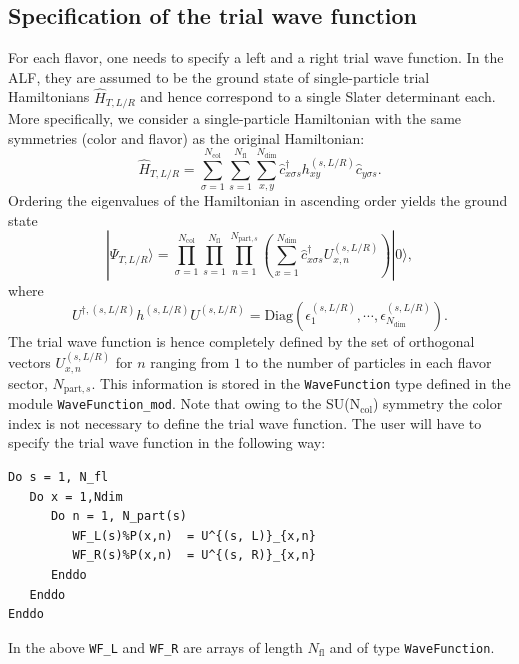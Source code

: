 \subsection{Specification of the trial wave function} \label{sec:trial_wave_function}

For each flavor, one needs to specify a left and a right trial wave function. In the ALF, they are assumed to be the ground state of single-particle trial Hamiltonians $\hat{H}_{T, L/R}$ and hence correspond to a single Slater determinant each. More specifically, we consider a single-particle Hamiltonian with the same symmetries (color and flavor) as the original Hamiltonian:
\begin{equation} \label{eq:trial_wave_function}
\hat{H}_{T,L/R} = 
\sum\limits_{\sigma=1}^{N_{\mathrm{col}}}
\sum\limits_{s=1}^{N_{\mathrm{fl}}}
\sum\limits_{x,y}^{N_{\mathrm{dim}}}
\hat{c}^{\dagger}_{x \sigma   s} h_{xy}^{(s, L/R)} \hat{c}^{\phantom\dagger}_{y \sigma s}.
\end{equation}
Ordering the eigenvalues  of the Hamiltonian in ascending order yields the ground state
\begin{equation}
	 | \Psi_{T,L/R} \rangle    =     \prod_{\sigma=1}^{N_{\mathrm{col}}}  \prod_{s=1}^{N_{\mathrm{fl}}}      \prod_{n=1}^{N_{\mathrm{part},s}} 
	 \left( \sum_{x=1}^{N_{\mathrm{dim}}}    \hat{c}^{\dagger}_{x \sigma   s} U^{(s, L/R)}_{x,n} \right) 
	  | 0 \rangle ,
\end{equation} 
where 
\begin{equation}
	U^{\dagger,(s, L/R)}h^{(s, L/R)}  U^{(s, L/R)}   = \mathrm{Diag} \left(   \epsilon_1^{(s, L/R)}, \cdots, \epsilon_{N_{\mathrm{dim}}}^{(s, L/R)} \right).
\end{equation}
The trial wave function is hence  completely defined by the set of orthogonal vectors  $ U^{(s, L/R)}_{x,n}  $    for  $ n $ ranging from  $ 1 $ to  the number of particles   in each flavor sector,  $N_{\mathrm{part},s}$.    This information  is stored in the \texttt{WaveFunction}   type defined in the module \texttt{WaveFunction\_mod}.    Note  that  owing to the SU(N$_{\mathrm{col}}$) symmetry the color index is not necessary to define  the trial wave function.  The user will have to specify the trial wave function in the following way:
\begin{lstlisting}[style=fortran]
Do s = 1, N_fl
   Do x = 1,Ndim
      Do n = 1, N_part(s)
         WF_L(s)%P(x,n)  = U^{(s, L)}_{x,n}
         WF_R(s)%P(x,n)  = U^{(s, R)}_{x,n}
      Enddo
   Enddo
Enddo
\end{lstlisting}
In the above    \texttt{WF\_L}  and \texttt{WF\_R}  are arrays  of length $N_{\mathrm{fl}}$ and of type \texttt{WaveFunction}.

